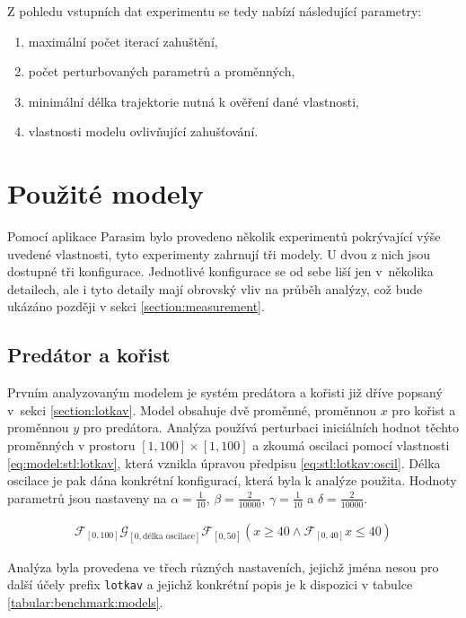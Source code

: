 Z pohledu vstupních dat experimentu se tedy nabízí následující parametry:

\begin{enumerate}
	\item	maximální počet iterací zahuštění,
	\item	počet perturbovaných parametrů a proměnných,
	\item	minimální délka trajektorie nutná k ověření dané vlastnosti,
	\item	vlastnosti modelu ovlivňující zahušťování.
\end{enumerate}

\section{Použité modely}

Pomocí aplikace Parasim bylo provedeno několik experimentů pokrývající výše uvedené vlastnosti, tyto experimenty
zahrnují tři modely. U dvou z nich jsou dostupné tři konfigurace. Jednotlivé konfigurace se od sebe liší 
jen v~několika detailech, ale i tyto detaily mají obrovský vliv na průběh analýzy, což bude ukázáno později
v sekci \ref{section:measurement}.

\subsection{Predátor a kořist}

Prvním analyzovaným modelem je systém predátora a kořisti již dříve popsaný v~sek\-ci \ref{section:lotkav}. Model
obsahuje dvě proměnné, proměnnou $x$ pro kořist a pro\-měn\-nou $y$ pro predátora. Analýza používá
perturbaci iniciálních hodnot  těchto proměnných v prostoru $[1, 100] \times [1, 100]$ a zkoumá oscilaci pomocí vlastnosti \ref{eq:model:stl:lotkav},
která vznikla úpravou předpisu \ref{eq:stl:lotkav:oscil}. Délka oscilace je pak dána konkrétní konfigurací,
která byla k analýze použita. Hodnoty parametrů jsou nastaveny na $\alpha = \frac{1}{10}$,  $\beta = \frac{2}{10000}$, $\gamma = \frac{1}{10}$ a $\delta = \frac{2}{10000}$.

\begin{align}
\label{eq:model:stl:lotkav}
\mathcal{F}_{[0, 100]}\mathcal{G}_{[0, \textrm{délka oscilace}]}\mathcal{F}_{[0, 50]}(x \geq 40 \wedge \mathcal{F}_{[0, 40]}x \leq 40)
\end{align}

Analýza byla provedena ve třech různých nastaveních, jejichž jména nesou pro další účely prefix \texttt{lotkav}
a jejichž konkrétní popis je k dispozici v tabulce \ref{tabular:benchmark:models}.

